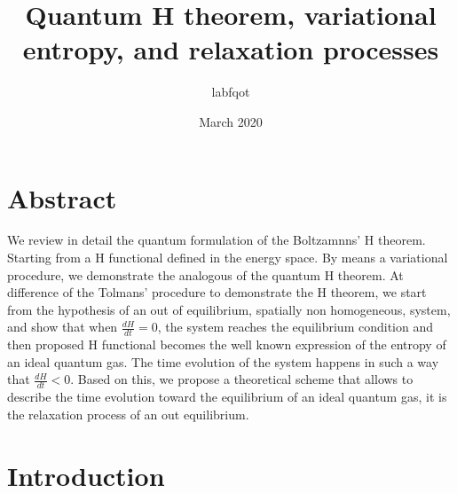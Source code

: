 \documentclass{article}
\title{Quantum H theorem, variational entropy, and relaxation processes}
\author{labfqot}
\date{March 2020}
\begin{document}
\maketitle

\section{Abstract}
We review in detail the quantum formulation of the Boltzamnns' H theorem. Starting from a H functional defined in the energy space. By means a variational procedure, we demonstrate the analogous of the quantum H theorem. At difference of the Tolmans' procedure to demonstrate the H theorem,  we start from the hypothesis of an out of equilibrium, spatially non homogeneous, system, and show that when $\frac{dH}{dt}=0$, the system reaches the equilibrium condition and then proposed H functional becomes the well known expression of the entropy of an ideal quantum gas. The time evolution of the system happens in such a way that $\frac{dH}{dt}<0$. Based on this, we propose a theoretical scheme that allows to describe the time evolution toward the equilibrium of an ideal quantum gas, it is the relaxation process of an out equilibrium.






\section{Introduction}

\end{document}
